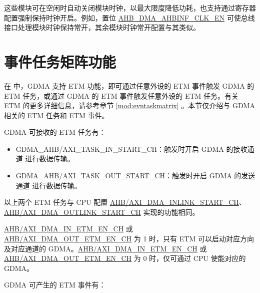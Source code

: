 \documentclass[main\_\_CN.tex]{subfiles}
\begin{document}
这些模块可在空闲时自动关闭模块时钟，以最大限度降低功耗，也支持通过寄存器配置强制保持时钟开启。例如，置位 \hyperref[fielddesc:AHBDMAAHBINFCLKEN]{AHB\_DMA\_AHBINF\_CLK\_EN} 可使总线接口处理模块时钟保持常开，其余模块时钟常开配置与其类似。

\section{事件任务矩阵功能} \label{sec:dma-etm-func}

在 \chipname{} 中，GDMA 支持 ETM 功能，即可通过任意外设的 ETM 事件触发 GDMA 的 ETM 任务，或通过 GDMA 的 ETM 事件触发任意外设的 ETM 任务。有关 ETM 的更多详细信息，请参考章节 \ref{mod:evntaskmatrix} 。本节仅介绍与 GDMA 相关的 ETM 任务和 ETM 事件。


GDMA 可接收的 ETM 任务有：

\begin{itemize}
\item GDMA\_AHB/AXI\_TASK\_IN\_START\_CH：触发时开启 GDMA 的接收通道  进行数据传输。
\item GDMA\_AHB/AXI\_TASK\_OUT\_START\_CH：触发时开启 GDMA 的发送通道  进行数据传输。
\end{itemize}

\begin{tiplisting}
以上两个 ETM 任务与 CPU 配置 \hyperref[fielddesc:AHBDMAINLINKSTARTCHN]{AHB/AXI\_DMA\_INLINK\_START\_CH}、\hyperref[fielddesc:AHBDMAOUTLINKSTARTCHN]{AHB/AXI\_DMA\_OUTLINK\_START\_CH} 实现的功能相同。

\hyperref[fielddesc:AHBDMAINETMENCHN]{AHB/AXI\_DMA\_IN\_ETM\_EN\_CH} 或 \hyperref[fielddesc:AHBDMAOUTETMENCHN]{AHB/AXI\_DMA\_OUT\_ETM\_EN\_CH} 为 1 时，只有 ETM 可以启动对应方向及对应通道的 GDMA。\hyperref[fielddesc:AHBDMAINETMENCHN]{AHB/AXI\_DMA\_IN\_ETM\_EN\_CH} 或 \hyperref[fielddesc:AHBDMAOUTETMENCHN]{AHB/AXI\_DMA\_OUT\_ETM\_EN\_CH} 为 0 时，仅可通过 CPU 使能对应的 GDMA。
\end{tiplisting}

GDMA 可产生的 ETM 事件有：
\end{document}
